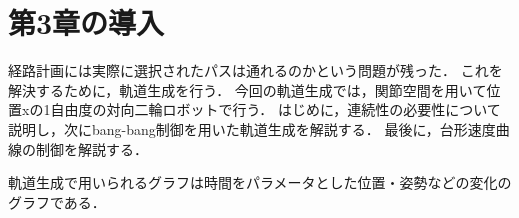
\section{第3章の導入}

経路計画には実際に選択されたパスは通れるのかという問題が残った．
これを解決するために，軌道生成を行う．
今回の軌道生成では，関節空間を用いて位置xの1自由度の対向二輪ロボットで行う．
はじめに，連続性の必要性について説明し，次にbang-bang制御を用いた軌道生成を解説する．
最後に，台形速度曲線の制御を解説する．

軌道生成で用いられるグラフは時間をパラメータとした位置・姿勢などの変化のグラフである．

\newpage
